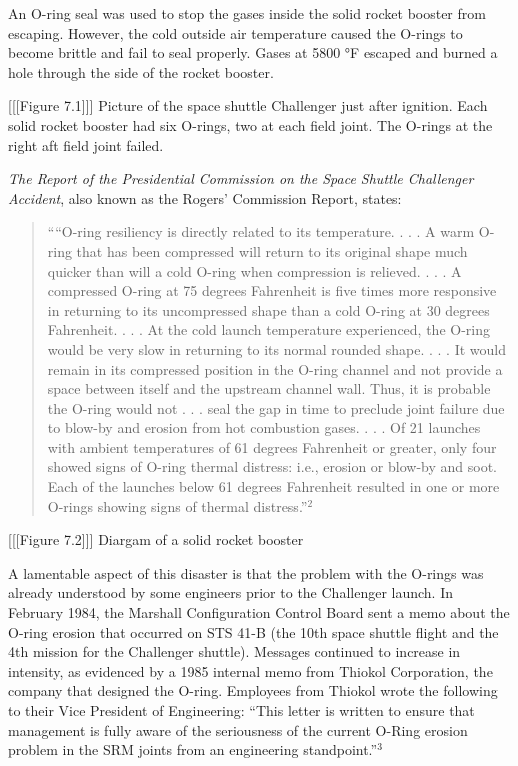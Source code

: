 \documentclass[
]{report}
\begin{document}
An O-ring seal was used to stop the gases inside the solid rocket booster from escaping. However, the cold outside air temperature caused the O-rings to become brittle and fail to seal properly. Gases at 5800 °F escaped and burned a hole through the side of the rocket booster.

{[}{[}{[}Figure 7.1{]}{]}{]}
Picture of the space shuttle Challenger just after ignition. Each solid rocket booster had six O-rings, two at each field joint. The O-rings at the right aft field joint failed.

\emph{The Report of the Presidential Commission on the Space Shuttle Challenger Accident}, also known as the Rogers' Commission Report, states:

\begin{quote}
````O-ring resiliency is directly related to its temperature. . . . A warm O-ring that has been compressed
will return to its original shape much quicker than will a cold O-ring when compression is relieved.
. . . A compressed O-ring at 75 degrees Fahrenheit is five times more responsive in returning to its
uncompressed shape than a cold O-ring at 30 degrees Fahrenheit. . . . At the cold launch temperature
experienced, the O-ring would be very slow in returning to its normal rounded shape. . . . It would
remain in its compressed position in the O-ring channel and not provide a space between itself and the
upstream channel wall. Thus, it is probable the O-ring would not . . . seal the gap in time to preclude
joint failure due to blow-by and erosion from hot combustion gases. . . . Of 21 launches with ambient
temperatures of 61 degrees Fahrenheit or greater, only four showed signs of O-ring thermal distress:
i.e., erosion or blow-by and soot. Each of the launches below 61 degrees Fahrenheit resulted in one
or more O-rings showing signs of thermal distress.''\(^2\)
\end{quote}

{[}{[}{[}Figure 7.2{]}{]}{]}
Diargam of a solid rocket booster

A lamentable aspect of this disaster is that the problem with the O-rings was already understood by
some engineers prior to the Challenger launch. In February 1984, the Marshall Configuration Control
Board sent a memo about the O-ring erosion that occurred on STS 41-B (the 10th space shuttle flight and
the 4th mission for the Challenger shuttle). Messages continued to increase in intensity, as evidenced by
a 1985 internal memo from Thiokol Corporation, the company that designed the O-ring. Employees from
Thiokol wrote the following to their Vice President of Engineering: ``This letter is written to ensure that
management is fully aware of the seriousness of the current O-Ring erosion problem in the SRM joints
from an engineering standpoint.''\(^3\)
\end{document}
